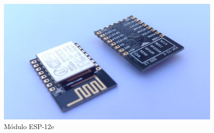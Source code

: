 \begin{figure}[htb]
		\centering
		\caption{Módulo ESP-12e \label{fig:esp-12e}}
		\includegraphics[width=1\textwidth]{041-esp8266/img/esp-12e-wide.jpg}
\end{figure}

